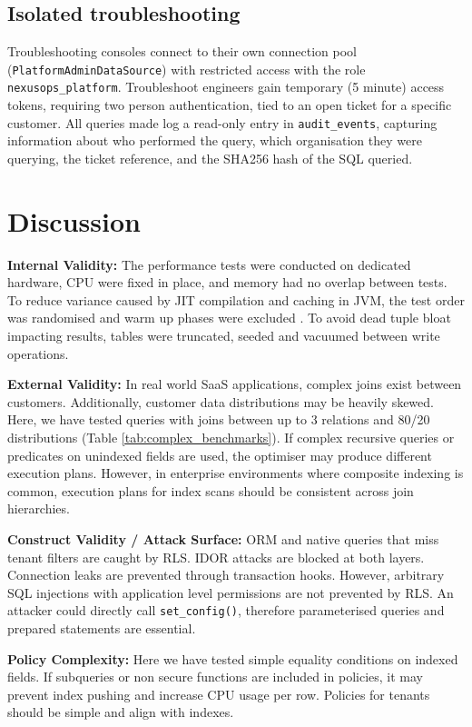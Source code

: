 \documentclass[conference]{IEEEtran}
\begin{document}
\subsection{Isolated troubleshooting}
Troubleshooting consoles connect to their own connection pool (\texttt{PlatformAdminDataSource}) with restricted access with the role \texttt{nexusops\_platform}. Troubleshoot engineers gain temporary (5 minute) access tokens, requiring two person authentication, tied to an open ticket for a specific customer. All queries made log a read-only entry in \texttt{audit\_events}, capturing information about who performed the query, which organisation they were querying, the ticket reference, and the SHA256 hash of the SQL queried.

\section{Discussion}
\label{sec:threats}

\textbf{Internal Validity:} The performance tests were conducted on dedicated hardware, CPU were fixed in place, and memory had no overlap between tests. To reduce variance caused by JIT compilation and caching in JVM, the test order was randomised and warm up phases were excluded \cite{georges2007}. To avoid dead tuple bloat impacting results, tables were truncated, seeded and vacuumed between write operations.

\textbf{External Validity:} In real world SaaS applications, complex joins exist between customers. Additionally, customer data distributions may be heavily skewed. Here, we have tested queries with joins between up to 3 relations and 80/20 distributions (Table \ref{tab:complex_benchmarks}). If complex recursive queries or predicates on unindexed fields are used, the optimiser may produce different execution plans. However, in enterprise environments where composite indexing is common, execution plans for index scans should be consistent across join hierarchies.

\textbf{Construct Validity / Attack Surface:} ORM and native queries that miss tenant filters are caught by RLS. IDOR attacks are blocked at both layers. Connection leaks are prevented through transaction hooks. However, arbitrary SQL injections with application level permissions are not prevented by RLS. An attacker could directly call \texttt{set\_config()}, therefore parameterised queries and prepared statements are essential.

\textbf{Policy Complexity:} Here we have tested simple equality conditions on indexed fields. If subqueries or non secure functions are included in policies, it may prevent index pushing and increase CPU usage per row. Policies for tenants should be simple and align with indexes.
\end{document}
